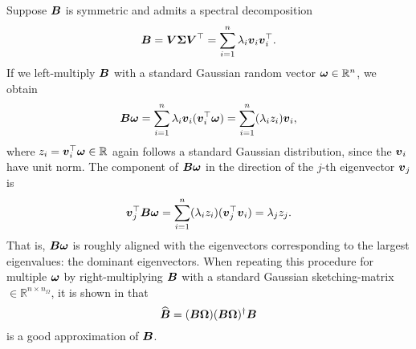 Suppose $\boldsymbol{B}$ is symmetric and admits a spectral decomposition
\begin{equation}
    \boldsymbol{B}
        = \boldsymbol{V} \boldsymbol{\Sigma} \boldsymbol{V}^{\top} 
        = \sum_{i=1}^n \lambda_i \boldsymbol{v}_i \boldsymbol{v}_i^{\top}.
    \label{equ:3-nystrom-sketching-spectral-decomposition}
\end{equation}
If we left-multiply $\boldsymbol{B}$ with a standard Gaussian random vector $\boldsymbol{\omega} \in \mathbb{R}^n$,
we obtain
\begin{equation}
    \boldsymbol{B}\boldsymbol{\omega}
        = \sum_{i=1}^n \lambda_i \boldsymbol{v}_i (\boldsymbol{v}_i^{\top} \boldsymbol{\omega})
        = \sum_{i=1}^n (\lambda_i  z_i) \boldsymbol{v}_i,
        \label{equ:3-nystrom-sketching-random-multiplication}
\end{equation}
where $z_i = \boldsymbol{v}_i^{\top} \boldsymbol{\omega} \in \mathbb{R}$ again follows a
standard Gaussian distribution, since the $\boldsymbol{v}_i$
have unit norm. The component of $\boldsymbol{B}\boldsymbol{\omega}$ in the direction of the
$j$-th eigenvector $\boldsymbol{v}_j$ is
\begin{equation}
    \boldsymbol{v}_j^{\top}\boldsymbol{B}\boldsymbol{\omega}
        = \sum_{i=1}^n (\lambda_i  z_i) (\boldsymbol{v}_j^{\top} \boldsymbol{v}_i)
        = \lambda_j  z_j.
        \label{equ:3-nystrom-sketching-dominant-component}
\end{equation}
That is, $\boldsymbol{B}\boldsymbol{\omega}$ is roughly aligned with the eigenvectors corresponding
to the largest eigenvalues: the dominant eigenvectors.
When repeating this procedure for multiple $\boldsymbol{\omega}$ by right-multiplying $\boldsymbol{B}$
with a standard Gaussian \gls{sketching-matrix} $\in \mathbb{R}^{n \times n_{\Omega}}$,
it is shown in \cite{halko2011finding} that
\begin{equation}
    \widehat{\boldsymbol{B}} = (\boldsymbol{B} \boldsymbol{\Omega}) (\boldsymbol{B} \boldsymbol{\Omega})^{\dagger} \boldsymbol{B}
    \label{equ:3-nystrom-RSVD}
\end{equation}
is a good approximation of $\boldsymbol{B}$.\\


